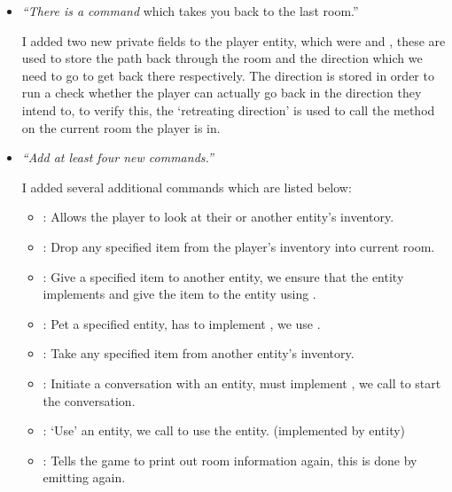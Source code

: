 \documentclass{article}
\begin{document}
\begin{multicols}{2}
\begin{itemize}[leftmargin=*]
                \item \textit{``There is a command}  {which takes you back to the last room.''}
                
                    I added two new private fields to the player entity, which were  and , these are used to store the path back through the room and the direction which we need to go to get back there respectively. The direction is stored in order to run a check whether the player can actually go back in the direction they intend to, to verify this, the `retreating direction' is used to call the method  on the current room the player is in.

                \item \textit{``Add at least four new commands.''}
                
                    I added several additional commands which are listed below:

                    \begin{itemize}[leftmargin=*]
                        \item {}: Allows the player to look at their or another entity's inventory.
                        \item {}: Drop any specified item from the player's inventory into current room.
                        \item {}: Give a specified item to another entity, we ensure that the entity implements  and give the item to the entity using .
                        \item {}: Pet a specified entity, has to implement , we use .
                        \item {}: Take any specified item from another entity's inventory.
                        \item {}: Initiate a conversation with an entity, must implement , we call  to start the conversation.
                        \item {}: `Use' an entity, we call  to use the entity. (implemented by entity)
                        \item {}: Tells the game to print out room information again, this is done by emitting  again.
                    \end{itemize}


\end{itemize}
\end{multicols}
\end{document}
